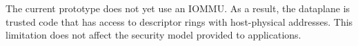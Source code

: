 The current \ix prototype does not yet use an IOMMU. As a result, the \ix dataplane is trusted
code that has access to descriptor rings with host-physical addresses.
This limitation does not affect the
security model provided to applications.



